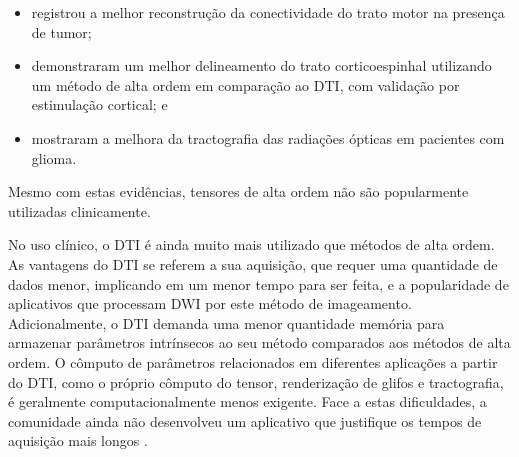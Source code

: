 \documentclass[
    12pt,                %
    oneside,            %
    a4paper,            %
    english,            %
    french,                %
    spanish,            %
    brazil                %
    ]{abntex2}
\begin{document}
\begin{itemize}
    \item {} registrou a melhor reconstrução da conectividade do trato motor na presença de tumor;
    \item {} demonstraram um melhor delineamento do trato corticoespinhal utilizando um método de alta ordem em comparação ao DTI, com validação por estimulação cortical; e
    \item {} mostraram a melhora da tractografia das radiações ópticas em pacientes com glioma.
\end{itemize}
Mesmo com estas evidências, tensores de alta ordem não são popularmente utilizadas clinicamente.



No uso clínico, o DTI é ainda muito mais utilizado que métodos de alta ordem. As vantagens do DTI se referem a sua aquisição, que requer uma quantidade de dados menor, implicando em um menor tempo para ser feita, e a popularidade de aplicativos que processam DWI por este método de imageamento. Adicionalmente, o DTI demanda uma menor quantidade memória para armazenar parâmetros intrínsecos ao seu método comparados aos métodos de alta ordem. O cômputo de parâmetros relacionados em diferentes aplicações a partir do DTI, como o próprio cômputo do tensor, renderização de glifos e tractografia, é geralmente computacionalmente menos exigente. Face a estas dificuldades, a comunidade ainda não desenvolveu um aplicativo que justifique os tempos de aquisição mais longos \cite{descoteaux2015}.



\end{document}
